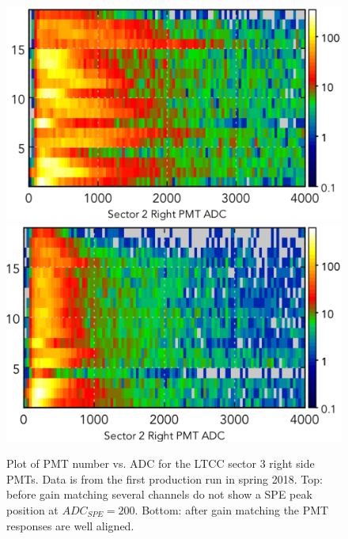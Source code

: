 \begin{figure}[H]
	\centering
	\includegraphics[width=1.05\columnwidth, keepaspectratio]{img/gainMatchingBefore.png}
	\includegraphics[width=1.05\columnwidth, keepaspectratio]{img/gainMatchingAfter.png}
	\caption{Plot of PMT number vs. ADC for the LTCC sector 3 right side PMTs. Data is from the first production
          run in spring 2018. Top: before gain matching several channels do not show a SPE peak position at
          $ADC_{SPE} = 200$. Bottom: after gain matching the PMT responses are well aligned.}
	\label{fig:gainMatching}
\end{figure}

